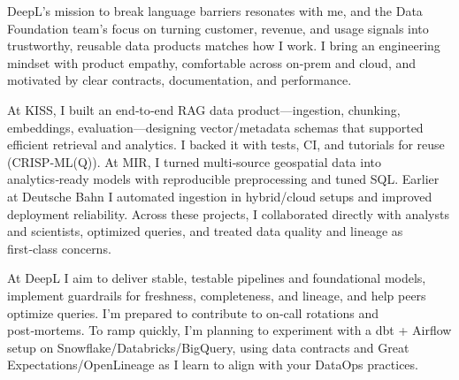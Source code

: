 

DeepL’s mission to break language barriers resonates with me, and the Data Foundation team’s focus on turning customer, revenue, and usage signals into trustworthy, reusable data products matches how I work. I bring an engineering mindset with product empathy, comfortable across on‑prem and cloud, and motivated by clear contracts, documentation, and performance.

At KISS, I built an end‑to‑end RAG data product—ingestion, chunking, embeddings, evaluation—designing vector/metadata schemas that supported efficient retrieval and analytics. I backed it with tests, CI, and tutorials for reuse (CRISP‑ML(Q)). At MIR, I turned multi‑source geospatial data into analytics‑ready models with reproducible preprocessing and tuned SQL. Earlier at Deutsche Bahn I automated ingestion in hybrid/cloud setups and improved deployment reliability. Across these projects, I collaborated directly with analysts and scientists, optimized queries, and treated data quality and lineage as first‑class concerns.

At DeepL I aim to deliver stable, testable pipelines and foundational models, implement guardrails for freshness, completeness, and lineage, and help peers optimize queries. I’m prepared to contribute to on‑call rotations and post‑mortems. To ramp quickly, I’m planning to experiment with a dbt + Airflow setup on Snowflake/Databricks/BigQuery, using data contracts and Great Expectations/OpenLineage as I learn to align with your DataOps practices.